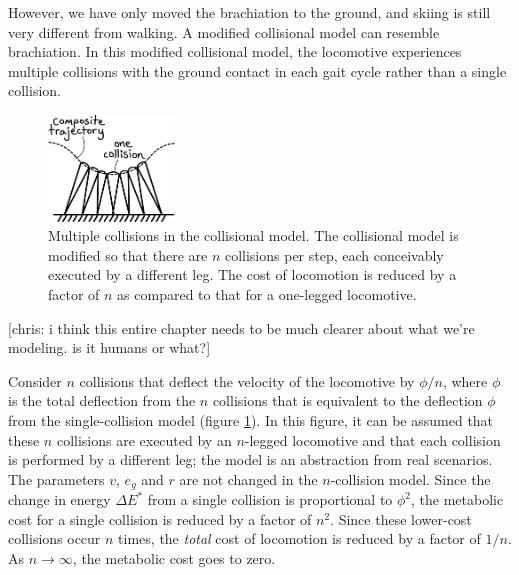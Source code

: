 However, we have only moved the brachiation to the ground, and skiing is still very different from walking. A modified collisional model can resemble brachiation. In this modified collisional model, the locomotive experiences multiple collisions with the ground contact in each gait cycle rather than a single collision.

\begin{figure}[h]		%
\begin{centering}
\includegraphics[width=0.3\textwidth]{Figures/MultipleCollisions}\par
\end{centering}
\caption[Diagram: Multiple collisions in the Collisional Model]{Multiple collisions in the collisional model. The collisional model is modified so that there are $n$ collisions per step, each conceivably executed by a different leg. The cost of locomotion is reduced by a factor of $n$ as compared to that for a one-legged locomotive.}
\label{fig:MultipleCollisions}
\end{figure}
%
[chris: i think this entire chapter needs to be much clearer about what we're modeling. is it humans or what?]

Consider $n$ collisions that deflect the velocity of the locomotive by $\phi/n$, where $\phi$ is the total deflection from the $n$ collisions that is equivalent to the deflection $\phi$ from the single-collision model (figure \ref{fig:MultipleCollisions}). In this figure, it can be assumed that these $n$ collisions are executed by an $n$-legged locomotive and that each collision is performed by a different leg; the model is an abstraction from real scenarios. The parameters $v$, $e_{g}$ and $r$ are not changed in the $n$-collision model. Since the change in energy $\Delta E^*$ from a single collision is proportional to $\phi^2$, the metabolic cost for a single collision is reduced by a factor of $n^2$. Since these lower-cost collisions occur $n$ times, the \emph{total} cost of locomotion is reduced by a factor of $1/n$. As $n \rightarrow \infty$, the metabolic cost goes to zero.


